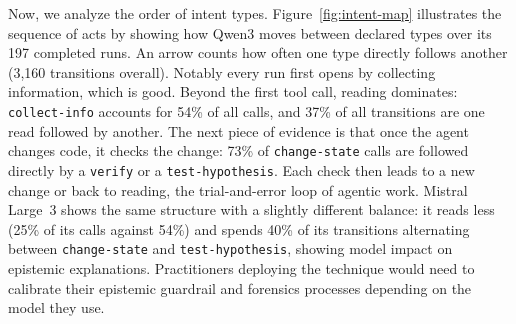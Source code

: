 \documentclass{article}
\theoremstyle{plain}
\theoremstyle{definition}
\theoremstyle{remark}
\begin{document}
Now, we analyze the order of intent types. Figure~\ref{fig:intent-map} illustrates the sequence of acts by showing how Qwen3 moves between declared types over its 197 completed runs. An arrow counts how often one type directly follows another (3,160 transitions overall). Notably every run first opens by collecting information, which is good. 
Beyond the first tool call, reading dominates: \texttt{collect-info} accounts for 54\% of all calls, and 37\% of all transitions are one read followed by another. 
The next piece of evidence is that once the agent changes code, it checks the change: 73\% of \texttt{change-state} calls are followed directly by a \texttt{verify} or a \texttt{test-hypothesis}.
Each check then leads to a new change or back to reading, the trial-and-error loop of agentic work. 
Mistral Large~3 shows the same structure with a slightly different balance: it reads less (25\% of its calls against 54\%) and spends 40\% of its transitions alternating between \texttt{change-state} and \texttt{test-hypothesis}, showing model impact on epistemic explanations. Practitioners deploying the technique would need to calibrate their epistemic guardrail and forensics processes depending on the model they use.

\end{document}

